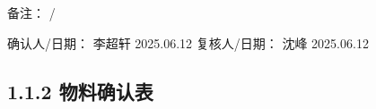 \documentclass[UTF8,10pt,a4paper,fontset=fandol]{ctexart}
\newcommand{\fieldvalue}[1]{#1}
\newcommand{\handwritten}[1]{#1}
\begin{document}
备注：
\fieldvalue{\handwritten{/}}

\noindent
确认人/日期：
\fieldvalue{\handwritten{李超轩}}
\quad
\fieldvalue{\handwritten{2025.06.12}}
\hfill
复核人/日期：
\fieldvalue{\handwritten{沈峰}}
\quad
\fieldvalue{\handwritten{2025.06.12}}

\subsection*{1.1.2 物料确认表}
\end{document}
